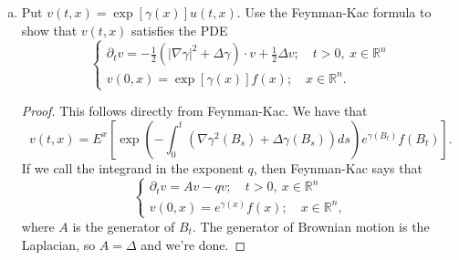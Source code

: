 \documentclass[11pt,letterpaper]{report}
\newcommand{\reals}{\mathbb{R}}
\begin{document}
\begin{enumerate}[(a)]
	\item Put $v(t,x) = \exp[\gamma(x)]u(t,x)$. Use the Feynman-Kac formula to show that $v(t,x)$ satisfies the PDE
	\[
	\begin{cases}
		\partial_t v = -\frac{1}{2}\left(|\nabla \gamma|^2 + \Delta \gamma\right)\cdot v + \frac{1}{2}\Delta v;\quad t>0,\ x\in \reals^n\\
		v(0,x) = \exp[\gamma(x)]f(x);\quad x\in \reals^n.
	\end{cases}
	\]
	\begin{proof}
		This follows directly from Feynman-Kac. We have that
		\[
		v(t,x) = E^x\left[\exp\left(-\int_0^t\left(\nabla\gamma^2(B_s) + \Delta\gamma(B_s)\right)ds\right)e^{\gamma(B_t)}f(B_t)\right].
		\]
		If we call the integrand in the exponent $q$, then Feynman-Kac says that
		\[
		\begin{cases}
			\partial_t v = Av - qv;\quad t>0,\ x\in \reals^n\\
			v(0,x) = e^{\gamma(x)}f(x);\quad x\in \reals^n,
		\end{cases}
		\]
		where $A$ is the generator of $B_t$. The generator of Brownian motion is the Laplacian, so $A = \Delta$ and we're done.
	\end{proof}
\end{enumerate}
\end{document}
